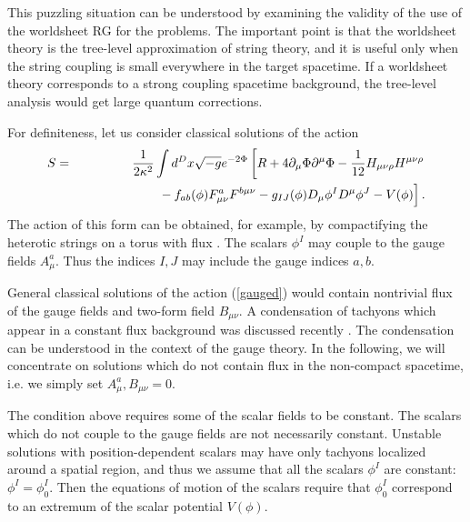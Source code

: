 \documentclass[a4paper,a4paper]{article}
\begin{document}
\vspace{2mm}

This puzzling situation can be understood by examining the validity of the 
use of the worldsheet RG for the problems. 
The important point is that the worldsheet theory is the tree-level approximation of string theory, 
and it is useful only when 
the string coupling is small everywhere in the target spacetime. 
If a worldsheet theory corresponds to a strong coupling spacetime background, the tree-level analysis would get 
large quantum corrections. 

\vspace{3mm}

For definiteness, let us consider classical solutions of the action 
\begin{eqnarray}
S &=& \frac1{2\kappa^2}\int d^Dx\sqrt{-g}e^{-2\Phi}\left[ R+4\partial_\mu\Phi\partial^\mu\Phi
     -\frac1{12}H_{\mu\nu\rho}H^{\mu\nu\rho}\right. \nonumber \\
  & & \hspace*{2cm}\left.\frac{ }{ }
     -f_{ab}(\phi)F^a_{\mu\nu}F^{b\mu\nu}-g_{IJ}(\phi)D_\mu\phi^I D^\mu\phi^J-V(\phi)\right]. 
            \label{gauged}
\end{eqnarray}
The action of this form can be obtained, for example, by compactifying the heterotic strings on a torus with 
flux \cite{SUGRA}. 
The scalars $\phi^I$ may couple to the gauge fields $A_\mu^a$. 
Thus the indices $I,J$ may include the gauge indices $a,b$. 

General classical solutions of the action (\ref{gauged}) would contain nontrivial flux of the gauge fields and 
two-form field $B_{\mu\nu}$. 
A condensation of tachyons which appear in a constant flux background was discussed recently \cite{flux}. 
The condensation can be understood 
in the context of the gauge 
theory. 
In the following, we will concentrate on solutions which do not contain flux in the non-compact spacetime, i.e. 
we simply set $A^a_\mu,B_{\mu\nu}=0$. 

The condition above requires some of the scalar fields to be constant. 
The scalars which do not couple to the gauge fields are not necessarily constant. 
Unstable solutions with position-dependent 
scalars may have only tachyons localized around a spatial region, and thus we 
assume that all the scalars $\phi^I$ are constant: $\phi^I=\phi_0^I$. 
Then the equations of motion of the scalars require that $\phi_0^I$ correspond to an extremum of 
the scalar potential $V(\phi)$. 
\end{document}
